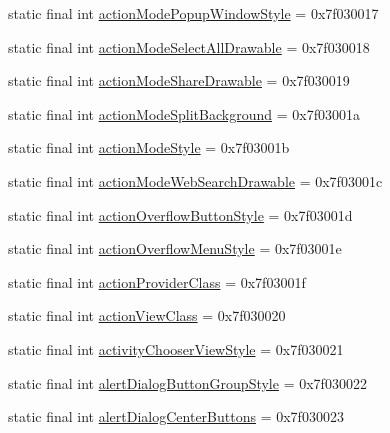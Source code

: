\begin{DoxyCompactItemize}
\item 
static final int \mbox{\hyperlink{classandroid_1_1support_1_1design_1_1R_1_1attr_a36582c93d9f5ca55e25c3f8913820b49}{action\+Mode\+Popup\+Window\+Style}} = 0x7f030017
\item 
static final int \mbox{\hyperlink{classandroid_1_1support_1_1design_1_1R_1_1attr_ab2a713bb29967a97cd4d8bebfa65b9ba}{action\+Mode\+Select\+All\+Drawable}} = 0x7f030018
\item 
static final int \mbox{\hyperlink{classandroid_1_1support_1_1design_1_1R_1_1attr_aaf7fd84ea5fbf46843fca2dd2376d8da}{action\+Mode\+Share\+Drawable}} = 0x7f030019
\item 
static final int \mbox{\hyperlink{classandroid_1_1support_1_1design_1_1R_1_1attr_a063adaf7bf2aedb313fccd7c9c406286}{action\+Mode\+Split\+Background}} = 0x7f03001a
\item 
static final int \mbox{\hyperlink{classandroid_1_1support_1_1design_1_1R_1_1attr_ac448239603f330b08cc4a76a2d01704d}{action\+Mode\+Style}} = 0x7f03001b
\item 
static final int \mbox{\hyperlink{classandroid_1_1support_1_1design_1_1R_1_1attr_a738dea168ce0bf399bfe38eccce9b38e}{action\+Mode\+Web\+Search\+Drawable}} = 0x7f03001c
\item 
static final int \mbox{\hyperlink{classandroid_1_1support_1_1design_1_1R_1_1attr_ad924f1960d613f38bbea6490e7bafac3}{action\+Overflow\+Button\+Style}} = 0x7f03001d
\item 
static final int \mbox{\hyperlink{classandroid_1_1support_1_1design_1_1R_1_1attr_ab8ba6f67460fb8b21432c3855ba1dc3b}{action\+Overflow\+Menu\+Style}} = 0x7f03001e
\item 
static final int \mbox{\hyperlink{classandroid_1_1support_1_1design_1_1R_1_1attr_ace4d4f4767149f10652ae11fa37ba6b4}{action\+Provider\+Class}} = 0x7f03001f
\item 
static final int \mbox{\hyperlink{classandroid_1_1support_1_1design_1_1R_1_1attr_afa305c5b28100674d981f2d3159f14fe}{action\+View\+Class}} = 0x7f030020
\item 
static final int \mbox{\hyperlink{classandroid_1_1support_1_1design_1_1R_1_1attr_a772f9b819db28308273b08c1e3927173}{activity\+Chooser\+View\+Style}} = 0x7f030021
\item 
static final int \mbox{\hyperlink{classandroid_1_1support_1_1design_1_1R_1_1attr_af6b9ec9b563431092df394acb9ab9d3a}{alert\+Dialog\+Button\+Group\+Style}} = 0x7f030022
\item 
static final int \mbox{\hyperlink{classandroid_1_1support_1_1design_1_1R_1_1attr_a0fe920d2f800df2ca3cb9f9c78b5a63d}{alert\+Dialog\+Center\+Buttons}} = 0x7f030023

\end{DoxyCompactItemize}
